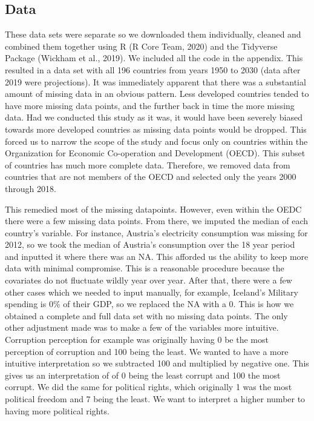 \documentclass[
  english,
  man,floatsintext]{apa6}
\begin{document}
\hypertarget{data}{%
\subsection{Data}\label{data}}

These data sets were separate so we downloaded them individually, cleaned and combined them together using R (R Core Team, 2020) and the Tidyverse Package (Wickham et al., 2019). We included all the code in the appendix. This resulted in a data set with all 196 countries from years 1950 to 2030 (data after 2019 were projections). It was immediately apparent that there was a substantial amount of missing data in an obvious pattern. Less developed countries tended to have more missing data points, and the further back in time the more missing data. Had we conducted this study as it was, it would have been severely biased towards more developed countries as missing data points would be dropped. This forced us to narrow the scope of the study and focus only on countries within the Organization for Economic Co-operation and Development (OECD). This subset of countries has much more complete data. Therefore, we removed data from countries that are not members of the OECD and selected only the years 2000 through 2018.

This remedied most of the missing datapoints. However, even within the OEDC there were a few missing data points. From there, we imputed the median of each country's variable. For instance, Austria's electricity consumption was missing for 2012, so we took the median of Austria's consumption over the 18 year period and inputted it where there was an NA. This afforded us the ability to keep more data with minimal compromise. This is a reasonable procedure because the covariates do not fluctuate wildly year over year. After that, there were a few other cases which we needed to input manually, for example, Iceland's Military spending is 0\% of their GDP, so we replaced the NA with a 0. This is how we obtained a complete and full data set with no missing data points. The only other adjustment made was to make a few of the variables more intuitive. Corruption perception for example was originally having 0 be the most perception of corruption and 100 being the least. We wanted to have a more intuitive interpretation so we subtracted 100 and multiplied by negative one. This gives us an interpretation of of 0 being the least corrupt and 100 the most corrupt. We did the same for political rights, which originally 1 was the most political freedom and 7 being the least. We want to interpret a higher number to having more political rights.
\end{document}
